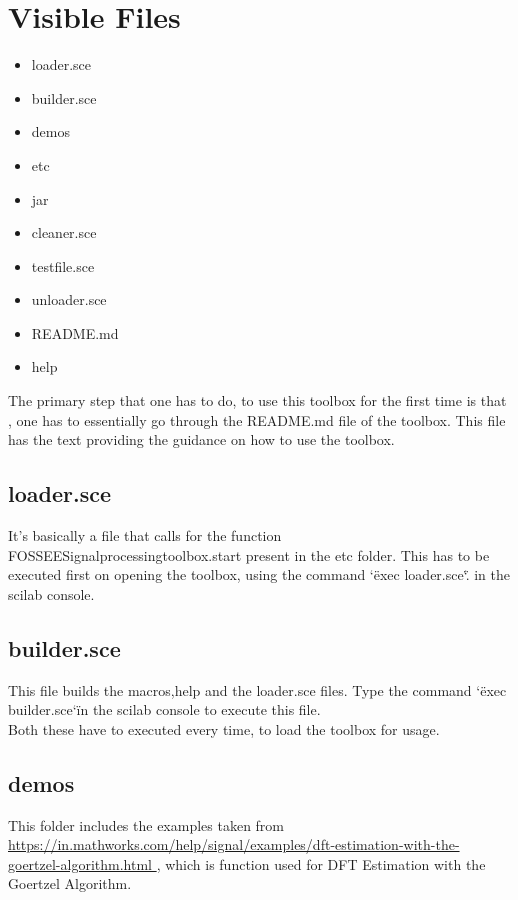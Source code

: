 \documentclass[12pt,a4paper]{report}
\begin{document}
\section{Visible Files}
\begin{itemize}
\item loader.sce
\item builder.sce
\item demos
\item etc
\item jar
\item cleaner.sce
\item testfile.sce
\item unloader.sce
\item README.md
\item help
\end{itemize}

The primary step that one has to do, to use this toolbox for the first time is that , one has to essentially go through the README.md file of the toolbox. This file has the text providing the guidance on how to use the toolbox.  

\subsection{loader.sce}
It’s basically a file that calls for the function FOSSEE\textunderscore Signal\textunderscore processing\textunderscore toolbox.start present in the etc folder. This has to be executed first on opening the toolbox, using the command \char`\"exec loader.sce\char`\".
in the scilab console.


\subsection{builder.sce}
This file builds the macros,help and the loader.sce files. Type the command \char`\"exec builder.sce\char`\" in the scilab console to execute this file.\\
Both these have to executed every time, to load the toolbox for usage.

\subsection{demos}
This folder includes the examples taken from  \url{https://in.mathworks.com/help/signal/examples/dft-estimation-with-the-goertzel-algorithm.html }, which is function used for DFT Estimation with the Goertzel Algorithm.
\end{document}
